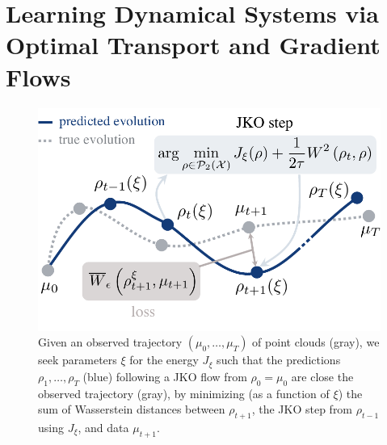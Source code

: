 \chapter[Learning Dynamical Systems via OT and Gradient Flows]{Learning Dynamical Systems via Optimal Transport and Gradient Flows}
\label{cha:neural_pde}



\begin{figure}[t]
    \centering
    \includegraphics[width=.9\linewidth]{figures/fig_overview_jkonet.pdf}
    \caption{Given an observed trajectory $(\mu_0,\dots,\mu_T)$ of point clouds (gray), we seek parameters $\xi$ for the energy $J_\xi$ such that the predictions $\rho_1, \dots, \rho_T$ (blue) following a JKO flow from $\rho_0=\mu_0$ are close the observed trajectory (gray), by minimizing (as a function of $\xi$) the sum of Wasserstein distances between $\rho_{t+1}$, the JKO step from $\rho_{t-1}$ using $J_\xi$, and data $\mu_{t+1}$.}
    \label{fig:overview}
\end{figure}

